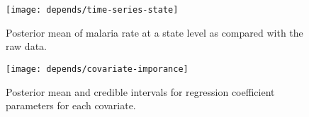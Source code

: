 \documentclass[
]{article}
\begin{document}
\begin{figure}

{\centering \texttt{[image: depends/time-series-state]} 

}

\caption{Posterior mean of malaria rate at a state level as compared with the raw data.}\label{fig:unnamed-chunk-2}
\end{figure}

\begin{figure}

{\centering \texttt{[image: depends/covariate-imporance]} 

}

\caption{Posterior mean and credible intervals for regression coefficient parameters for each covariate.}\label{fig:unnamed-chunk-3}
\end{figure}
\end{document}
